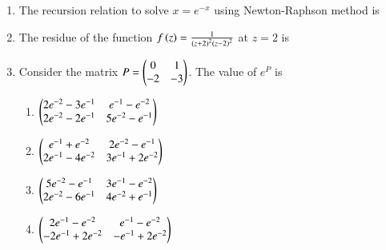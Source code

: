 \documentclass[a4paper, 11pt]{article}
\begin{document}
\begin{enumerate}
    \item The recursion relation to solve $x=e^{-x}$ using Newton-Raphson method is
    \begin{enumerate}
    \end{enumerate}

    \hfill{}

    \item The residue of the function $f\left(z\right) = \frac{1}{\left(z+2\right)^2\left(z-2\right)^2}$ at $z=2$ is
    \begin{enumerate}
    \end{enumerate}
    
    \hfill{}

    \item Consider the matrix $P=\begin{pmatrix}0 & 1 \\ -2 & -3\end{pmatrix}$. The value of $e^P$ is
    \begin{enumerate}
        \item $\begin{pmatrix}2e^{-2}-3e^{-1} & e^{-1}-e^{-2} \\ 2e^{-2}-2e^{-1} & 5e^{-2}-e^{-1}\end{pmatrix}$
        \item $\begin{pmatrix}e^{-1}+e^{-2} & 2e^{-2}-e^{-1} \\ 2e^{-1}-4e^{-2} & 3e^{-1}+2e^{-2}\end{pmatrix}$
        \item $\begin{pmatrix}5e^{-2}-e^{-1} & 3e^{-1}-e^{-2} \\ 2e^{-2}-6e^{-1} & 4e^{-2}+e^{-1}\end{pmatrix}$
        \item $\begin{pmatrix}2e^{-1}-e^{-2} & e^{-1}-e^{-2} \\ -2e^{-1}+2e^{-2} & -e^{-1}+2e^{-2}\end{pmatrix}$
    \end{enumerate}


\end{enumerate}
\end{document}
